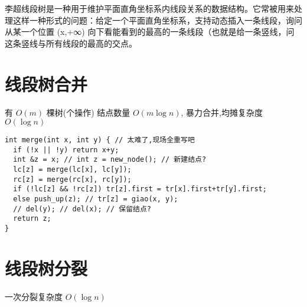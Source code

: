 \documentclass[12pt]{article}
\begin{document}
{{{{{{{{{{{{{{{{{{李超线段树是一种用于维护平面直角坐标系内线段关系的数据结构。它常被用来处理这样一种形式的问题：给定一个平面直角坐标系，支持动态插入一条线段，询问从某一个位置 (x,+∞) 向下看能看到的最高的一条线段（也就是给一条竖线，问这条竖线与所有线段的最高的交点。

\section{ 线段树合并}

有 $O(m)$ 棵树(个操作) 结点数量 $O(m\log n)$, 暴力合并,均摊复杂度 $O(\log n)$

{\setmainfont{Consolas}
\begin{lstlisting}
int merge(int x, int y) { // 太难了,现场全重写吧
  if (!x || !y) return x+y;
  int &z = x; // int z = new_node(); // 新建结点?
  lc[z] = merge(lc[x], lc[y]);
  rc[z] = merge(rc[x], rc[y]);
  if (!lc[z] && !rc[z]) tr[z].first = tr[x].first+tr[y].first;
  else push_up(z); // tr[z] = giao(x, y);
  // del(y); // del(x); // 保留结点?
  return z;
}
\end{lstlisting}

\section{ 线段树分裂}

一次分裂复杂度 $O(\log n)$

}}}}}}}}}}}}}}}}}}}
\end{document}
